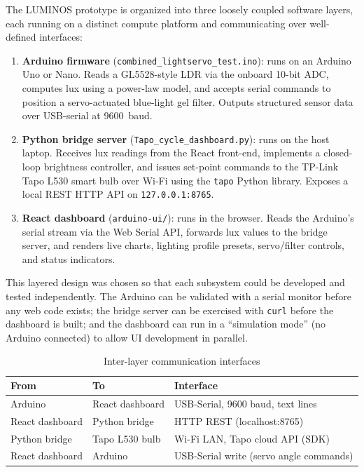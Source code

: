 \documentclass[12pt,letterpaper]{article}
\begin{document}
The LUMINOS prototype is organized into three loosely coupled software layers,
each running on a distinct compute platform and communicating over well-defined
interfaces:

\begin{enumerate}
  \item \textbf{Arduino firmware} (\texttt{combined\_lightservo\_test.ino}):
        runs on an Arduino Uno or Nano. Reads a GL5528-style LDR via the onboard
        10-bit ADC, computes lux using a power-law model, and accepts serial
        commands to position a servo-actuated blue-light gel filter. Outputs
        structured sensor data over USB-serial at 9600~baud.

  \item \textbf{Python bridge server} (\texttt{Tapo\_cycle\_dashboard.py}):
        runs on the host laptop. Receives lux readings from the React front-end,
        implements a closed-loop brightness controller, and issues set-point
        commands to the TP-Link Tapo L530 smart bulb over Wi-Fi using the
        \texttt{tapo} Python library. Exposes a local REST HTTP API on
        \texttt{127.0.0.1:8765}.

  \item \textbf{React dashboard} (\texttt{arduino-ui/}):
        runs in the browser. Reads the Arduino's serial stream via the
        Web Serial API, forwards lux values to the bridge server, and renders
        live charts, lighting profile presets, servo/filter controls, and
        status indicators.
\end{enumerate}

This layered design was chosen so that each subsystem could be developed and
tested independently. The Arduino can be validated with a serial monitor before
any web code exists; the bridge server can be exercised with \texttt{curl}
before the dashboard is built; and the dashboard can run in a ``simulation
mode'' (no Arduino connected) to allow UI development in parallel.

\begin{table}[H]
  \centering
  \caption{Inter-layer communication interfaces}
  \label{tab:interfaces}
  \begin{tabular}{lll}
    \toprule
    \textbf{From} & \textbf{To} & \textbf{Interface} \\
    \midrule
    Arduino & React dashboard & USB-Serial, 9600 baud, text lines \\
    React dashboard & Python bridge & HTTP REST (localhost:8765) \\
    Python bridge & Tapo L530 bulb & Wi-Fi LAN, Tapo cloud API (SDK) \\
    React dashboard & Arduino & USB-Serial write (servo angle commands) \\
    \bottomrule
  \end{tabular}
\end{table}
\end{document}
